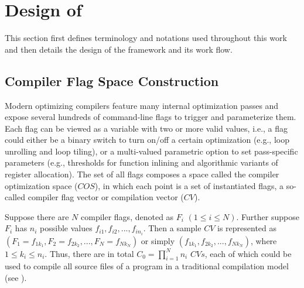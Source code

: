 \section{Design of \toolname} \label{design}

This section first defines terminology and notations used throughout this
work and then details the design of the \toolname framework and its
work flow.
\vspace{-1.5mm}
\subsection{Compiler Flag Space Construction}

Modern optimizing compilers feature many internal optimization passes
and expose several hundreds of command-line flags to trigger and
parameterize them.  Each flag can be viewed as a variable with two or
more valid values, i.e., a flag could either be a binary switch
to turn on/off a certain optimization (e.g., loop unrolling and loop
tiling), or a multi-valued parametric option to set pass-specific
parameters (e.g., thresholds for function inlining and algorithmic
variants of register allocation).
%
The set of all flags composes a space called the compiler optimization
space ($COS$), in which each point is a set of instantiated flags, a
so-called compiler flag vector or compilation vector ($CV$).

Suppose there are $N$ compiler flags, denoted as $F_i$
$(1\leq{i}\leq{N})$.  Further suppose $F_i$ has $n_i$ possible values
$f_{i1}, f_{i2}, ..., f_{i{n_i}}$.  Then a sample $CV$ is represented
as $(F_1=f_{1k_{1}}, F_2=f_{2k_{2}}, ..., F_N=f_{Nk_{N}})$ or simply
$(f_{1k_{1}}, f_{2k_{2}}, ..., f_{Nk_{N}})$, where
$1 \leq{k_i} \leq{n_i}$.  Thus, there are in total
$C_0=\prod_{i=1}^{N} n_{i}$ $CVs$, each of which could be used to
compile all source files of a program in a traditional compilation
model (see ).

